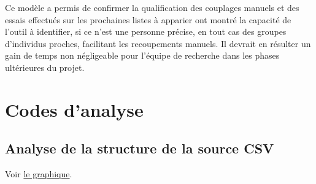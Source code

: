 \documentclass[a4paper,12pt,twoside]{book}
\begin{document}
		Ce modèle a permis de confirmer la qualification des couplages manuels et des essais effectués sur les prochaines listes à apparier ont montré la capacité de l'outil à identifier, si ce n'est une personne précise, en tout cas des groupes d'individus proches, facilitant les recoupements manuels. Il devrait en résulter un gain de temps non négligeable pour l'équipe de recherche dans les phases ultérieures du projet.
		

	\pagestyle{empty}
	\cleardoublepage
				
	\appendix
	
	\renewcommand{\appendixpagename}{Annexes}
	
	\renewcommand{\appendixtocname}{Annexes}
	
	\addappheadtotoc%
	
	\appendixpage %
	
	\cleardoublepage
	\pagestyle{plain}
	
    \chapter{Codes d'analyse}
		\label{analyses}
		
		\section{Analyse de la structure de la source CSV}
		
		Voir \hyperref[fig10]{le graphique}.
		\label{analyse1}
		    
\end{document}
